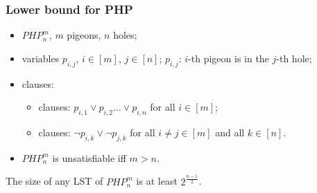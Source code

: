 \begin{frame}
    \frametitle{Lower bound for PHP}

    \begin{itemize}
		\item $PHP^m_n$, $m$ pigeons, $n$ holes;
		\item variables $p_{i, j}$, $i \in [m]$, $j \in [n]$; 
			$p_{i, j}$: $i$-th pigeon is in the $j$-th hole;
		\item clauses:
			\begin{itemize}
				\item {} clauses: $p_{i, 1} \lor p_{i, 2} \dots \lor p_{i, n}$ for all $i \in [m]$;
				\item {} clauses: $\lnot p_{i, k} \lor \lnot p_{j, k}$ for all $i \neq j \in [m]$ and all $k
					\in [n]$.
			\end{itemize}
		\item $PHP^m_n$ is unsatisfiable iff $m > n$.
	\end{itemize}
    
	\pause

    \begin{theorem}
        The size of any LST of $PHP^m_n$ is at least $2^{\frac{n - 1}{2}}$.
    \end{theorem}

\end{frame}






